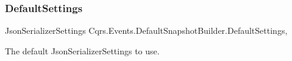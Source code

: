 \subsubsection{\texorpdfstring{Default\+Settings}{DefaultSettings}}
{\footnotesize\ttfamily Json\+Serializer\+Settings Cqrs.\+Events.\+Default\+Snapshot\+Builder.\+Default\+Settings\hspace{0.3cm}{\ttfamily [static]}, {\ttfamily [get]}}



The default Json\+Serializer\+Settings to use. 

